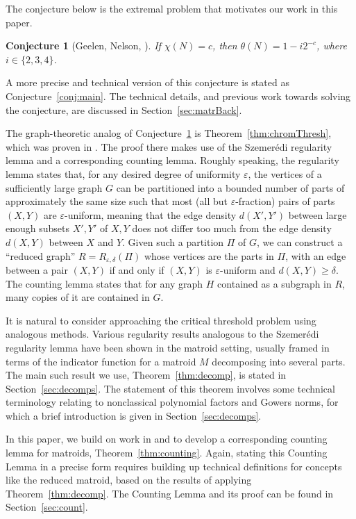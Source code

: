 \documentclass{article}
\theoremstyle{plain}
\newtheorem{conj}[theorem]{Conjecture}
\theoremstyle{definition}
\theoremstyle{definition}
\theoremstyle{remark}
\numberwithin{equation}{section}
\begin{document}
The conjecture below is the extremal problem that motivates our work in this paper.
\begin{conj}[Geelen, Nelson, {\cite[Conj~1.7]{main}}]
\label{conj:mainsimp}
If $\chi(N)=c$, then $\theta(N)=1-i2^{-c}$, where $i\in \{2,3,4\}$.
\end{conj}

A more precise and technical version of this conjecture is stated as Conjecture~\ref{conj:main}. The technical details, and previous work towards solving the conjecture, are discussed in Section~\ref{sec:matrBack}.

The graph-theoretic analog of Conjecture~\ref{conj:mainsimp} is Theorem~\ref{thm:chromThresh}, which was proven in \cite{chromThresh}. The proof there makes use of the Szemerédi regularity lemma and a corresponding counting lemma. Roughly speaking, the regularity lemma states that, for any desired degree of uniformity $\varepsilon$, the vertices of a sufficiently large graph $G$ can be partitioned into a bounded number of parts of approximately the same size such that most (all but $\varepsilon$-fraction) pairs of parts $(X,Y)$ are $\varepsilon$-uniform, meaning that the edge density $d(X',Y')$ between large enough subsets $X',Y'$ of $X,Y$ does not differ too much from the edge density $d(X,Y)$ between $X$ and $Y$. Given such a partition $\Pi$ of $G$, we can construct a ``reduced graph'' $R=R_{\varepsilon,\delta}(\Pi)$ whose vertices are the parts in $\Pi$, with an edge between a pair $(X,Y)$ if and only if $(X,Y)$ is $\varepsilon$-uniform and $d(X,Y)\geq \delta$. The counting lemma states that for any graph $H$ contained as a subgraph in $R$, many copies of it are contained in $G$.

It is natural to consider approaching the critical threshold problem using analogous methods. Various regularity results analogous to the Szemerédi regularity lemma have been shown in the matroid setting, usually framed in terms of the indicator function for a matroid $M$ decomposing into several parts. The main such result we use, Theorem~\ref{thm:decomp}, is stated in Section~\ref{sec:decomps}. The statement of this theorem involves some technical terminology relating to nonclassical polynomial factors and Gowers norms, for which a brief introduction is given in Section~\ref{sec:decomps}.

In this paper, we build on work in \cite{VeryCountingMaybe} and \cite{hatamiRegCount} to develop a corresponding counting lemma for matroids, Theorem~\ref{thm:counting}. Again, stating this Counting Lemma in a precise form requires building up technical definitions for concepts like the reduced matroid, based on the results of applying Theorem~\ref{thm:decomp}. The Counting Lemma and its proof can be found in Section~\ref{sec:count}.
\end{document}

